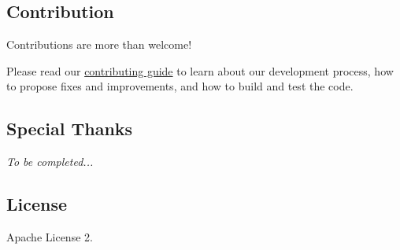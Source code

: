 \subsection*{Contribution}

Contributions are more than welcome!

Please read our \hyperlink{_c_o_n_t_r_i_b_u_t_i_n_g_8md}{contributing guide} to learn about our development process, how to propose fixes and improvements, and how to build and test the code.

\subsection*{Special Thanks}

{\itshape To be completed...}

\subsection*{License}

Apache License 2. 